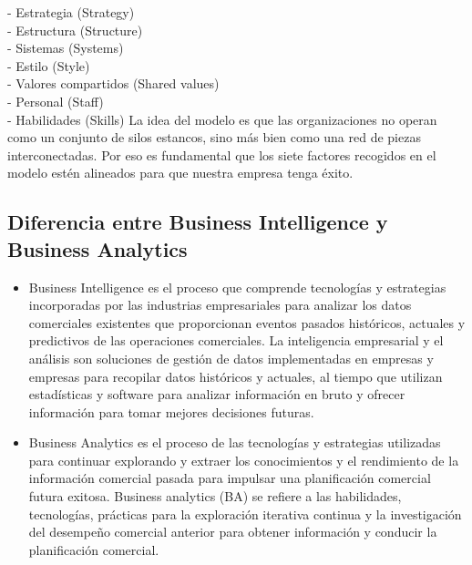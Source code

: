 \documentclass[%
 reprint,
 amsmath,amssymb,
 aps,
]{revtex4-1}
\begin{document}
\begin{itemize}
- Estrategia (Strategy)\\
- Estructura (Structure)\\
- Sistemas (Systems)\\
- Estilo (Style)\\
- Valores compartidos (Shared values)\\
- Personal (Staff)\\
- Habilidades (Skills)
La idea del modelo es que las organizaciones no operan como un conjunto de silos estancos, sino más bien como una red de piezas interconectadas. Por eso es fundamental que los siete factores recogidos en el modelo estén alineados para que nuestra empresa tenga éxito.
	\end{itemize} 

\subsection{Diferencia entre Business Intelligence y Business Analytics}
	     \begin{itemize}
		\item Business Intelligence es el proceso que comprende tecnologías y estrategias incorporadas por las industrias empresariales para analizar los datos comerciales existentes que proporcionan eventos pasados históricos, actuales y predictivos de las operaciones comerciales.
La inteligencia empresarial y el análisis son soluciones de gestión de datos implementadas en empresas y empresas para recopilar datos históricos y actuales, al tiempo que utilizan estadísticas y software para analizar información en bruto y ofrecer información para tomar mejores decisiones futuras.

		\item Business Analytics es el proceso de las tecnologías y estrategias utilizadas para continuar explorando y extraer los conocimientos y el rendimiento de la información comercial pasada para impulsar una planificación comercial futura exitosa.
Business analytics (BA) se refiere a las habilidades, tecnologías, prácticas para la exploración iterativa continua y la investigación del desempeño comercial anterior para obtener información y conducir la planificación comercial.
\cite{Educba}
	           \end{itemize}
\end{document}
